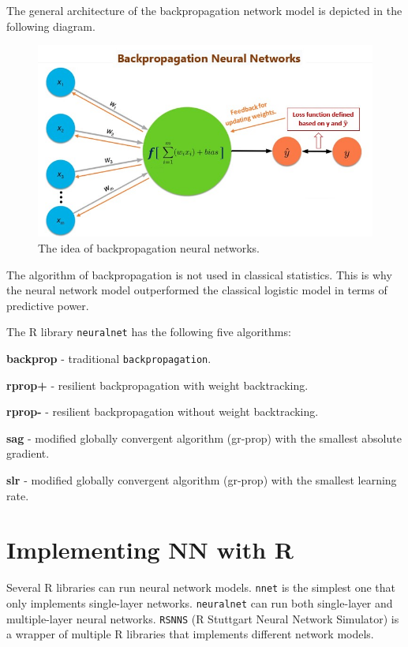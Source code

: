 \documentclass[
]{book}
\begin{document}
The general architecture of the backpropagation network model is depicted in the following diagram.

\begin{figure}

{\centering \includegraphics[width=0.6\linewidth]{img07/w07-backpropagationNN} 

}

\caption{The idea of backpropagation neural networks.}\label{fig:unnamed-chunk-146}
\end{figure}

The algorithm of backpropagation is not used in classical statistics. This is why the neural network model outperformed the classical logistic model in terms of predictive power.

The R library \texttt{neuralnet} has the following five algorithms:

\textbf{backprop} - traditional \texttt{backpropagation}.

\textbf{rprop+} - resilient backpropagation with weight backtracking.

\textbf{rprop-} - resilient backpropagation without weight backtracking.

\textbf{sag} - modified globally convergent algorithm (gr-prop) with the smallest absolute gradient.

\textbf{slr} - modified globally convergent algorithm (gr-prop) with the smallest learning rate.

\hfill\break

\hypertarget{implementing-nn-with-r}{%
\section{Implementing NN with R}\label{implementing-nn-with-r}}

Several R libraries can run neural network models. \texttt{nnet} is the simplest one that only implements single-layer networks. \texttt{neuralnet} can run both single-layer and multiple-layer neural networks. \texttt{RSNNS} (R Stuttgart Neural Network Simulator) is a wrapper of multiple R libraries that implements different network models.
\end{document}
